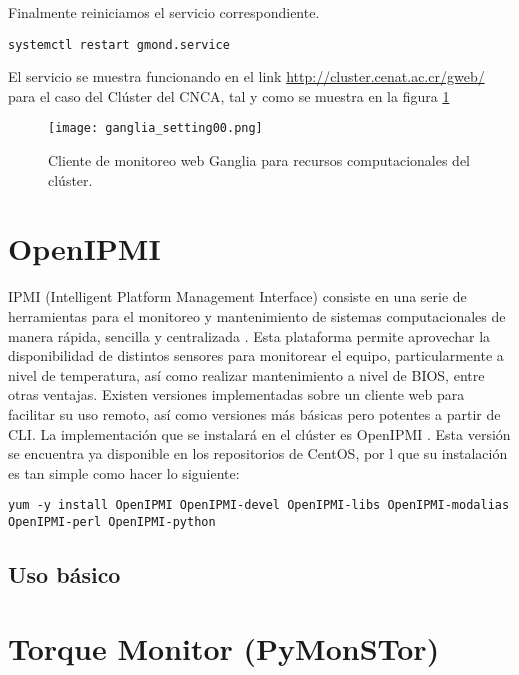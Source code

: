 Finalmente reiniciamos el servicio correspondiente.

\begin{lstlisting}
systemctl restart gmond.service
\end{lstlisting}

El servicio se muestra funcionando en el link \url{http://cluster.cenat.ac.cr/gweb/} para el caso del Clúster del CNCA, tal y como se muestra en la figura \ref{fig:ganglia:00}

\begin{figure}[H]
\centering
\texttt{[image: ganglia\_setting00.png]}
\caption{Cliente de monitoreo web Ganglia para recursos computacionales del clúster.}
\label{fig:ganglia:00}
\end{figure}

\section{OpenIPMI}

IPMI (Intelligent Platform Management Interface) consiste en una serie de herramientas para el monitoreo y mantenimiento de sistemas computacionales de manera rápida, sencilla y centralizada \cite{ipmisupermicro}. Esta plataforma permite aprovechar la disponibilidad de distintos sensores para monitorear el equipo, particularmente a nivel de temperatura, así como realizar mantenimiento a nivel de BIOS, entre otras ventajas. Existen versiones implementadas sobre un cliente web para facilitar su uso remoto, así como versiones más básicas pero potentes a partir de CLI. La implementación que se instalará en el clúster es OpenIPMI \cite{openipmi}. Esta versión se encuentra ya disponible en los repositorios de CentOS, por l que su instalación es tan simple como hacer lo siguiente:

\begin{lstlisting}
yum -y install OpenIPMI OpenIPMI-devel OpenIPMI-libs OpenIPMI-modalias OpenIPMI-perl OpenIPMI-python
\end{lstlisting}

\subsection{Uso básico}


\section{Torque Monitor (PyMonSTor)}

